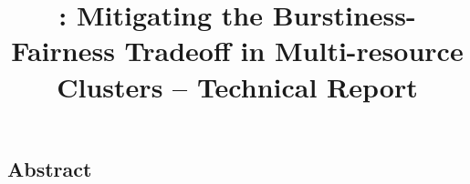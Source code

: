\documentclass[preprint]{sigplanconf-eurosys}
\title{\Large \bf \name: Mitigating the Burstiness-Fairness Tradeoff in Multi-resource Clusters -- Technical Report}
\begin{document}
\maketitle

\subsection*{Abstract}






















%
%



%

%

\end{document}
